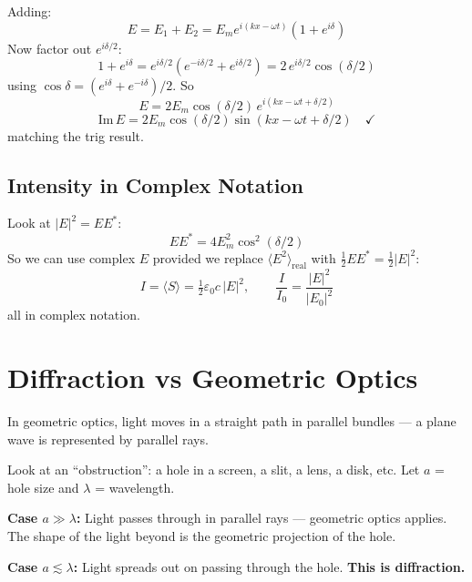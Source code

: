 \documentclass[11pt]{report}
\begin{document}
Adding:
\begin{equation}
E = E_1 + E_2 = E_m e^{i(kx-\omega t)}(1 + e^{i\delta})
\end{equation}
Now factor out $e^{i\delta/2}$:
\begin{equation}
1 + e^{i\delta} = e^{i\delta/2}(e^{-i\delta/2} + e^{i\delta/2}) = 2\,e^{i\delta/2}\cos(\delta/2)
\end{equation}
using $\cos\delta = (e^{i\delta} + e^{-i\delta})/2$. So
\begin{equation}
E = 2 E_m \cos(\delta/2)\, e^{i(kx-\omega t + \delta/2)}
\end{equation}
\begin{equation}
\mathrm{Im}\,E = 2E_m \cos(\delta/2) \sin(kx - \omega t + \delta/2) \quad \checkmark
\end{equation}
matching the trig result.

\subsection*{Intensity in Complex Notation}

Look at $|E|^2 = E E^*$:
\begin{equation}
E E^* = 4 E_m^2 \cos^2(\delta/2)
\end{equation}
So we can use complex $E$ provided we replace $\langle E^2\rangle_{\text{real}}$ with $\tfrac{1}{2}EE^* = \tfrac{1}{2}|E|^2$:
\begin{equation}
\boxed{I = \langle S\rangle = \tfrac{1}{2}\varepsilon_0 c\,|E|^2, \qquad \frac{I}{I_0} = \frac{|E|^2}{|E_0|^2}}
\end{equation}
all in complex notation.

\section{Diffraction vs Geometric Optics}

In geometric optics, light moves in a straight path in parallel bundles --- a plane wave is represented by parallel rays.

Look at an ``obstruction'': a hole in a screen, a slit, a lens, a disk, etc. Let $a$ = hole size and $\lambda$ = wavelength.

\textbf{Case $a \gg \lambda$:} Light passes through in parallel rays --- geometric optics applies. The shape of the light beyond is the geometric projection of the hole.

\textbf{Case $a \lesssim \lambda$:} Light spreads out on passing through the hole. \textbf{This is diffraction.}
\end{document}
